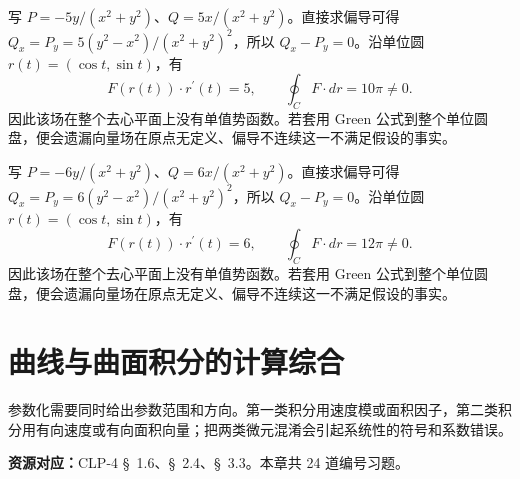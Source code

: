 \documentclass[12pt,fontset=fandol]{ctexart}
\begin{document}
\begin{solve}\label{ans:c41q24}
写 $P=-5y/(x^2+y^2)$、$Q=5x/(x^2+y^2)$。直接求偏导可得 $Q_x=P_y=5(y^2-x^2)/(x^2+y^2)^2$，所以 $Q_x-P_y=0$。沿单位圆 $r(t)=(\cos t,\sin t)$，有
\[
F(r(t))\cdot r^{\prime}(t)=5,\qquad\oint_C F\cdot dr=10\pi\ne0.
\]
因此该场在整个去心平面上没有单值势函数。若套用 Green 公式到整个单位圆盘，便会遗漏向量场在原点无定义、偏导不连续这一不满足假设的事实。
\end{solve}

\begin{solve}\label{ans:c41q25}
写 $P=-6y/(x^2+y^2)$、$Q=6x/(x^2+y^2)$。直接求偏导可得 $Q_x=P_y=6(y^2-x^2)/(x^2+y^2)^2$，所以 $Q_x-P_y=0$。沿单位圆 $r(t)=(\cos t,\sin t)$，有
\[
F(r(t))\cdot r^{\prime}(t)=6,\qquad\oint_C F\cdot dr=12\pi\ne0.
\]
因此该场在整个去心平面上没有单值势函数。若套用 Green 公式到整个单位圆盘，便会遗漏向量场在原点无定义、偏导不连续这一不满足假设的事实。
\end{solve}

\clearpage
\section{曲线与曲面积分的计算综合}\label{sec:ch42}
参数化需要同时给出参数范围和方向。第一类积分用速度模或面积因子，第二类积分用有向速度或有向面积向量；把两类微元混淆会引起系统性的符号和系数错误。

\textbf{资源对应：}CLP-4 \S~1.6、\S~2.4、\S~3.3。本章共 24 道编号习题。
\end{document}
